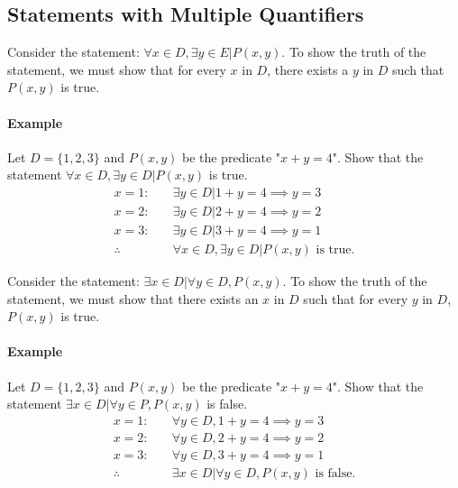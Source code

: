 \subsection{Statements with Multiple Quantifiers}
\hrulefill

Consider the statement: $\forall x \in D, \exists y \in E | P(x,y)$. To show the truth of the statement, 
we must show that for every $x$ in $D$, there exists a $y$ in $D$ such that $P(x,y)$ is true.

\paragraph*{Example}
Let $D = \{1,2,3\}$ and $P(x,y)$ be the predicate "$x + y = 4$". Show that the statement
$\forall x \in D, \exists y \in D | P(x,y)$ is true.
\begin{align*}
    x = 1: \quad &\exists y \in D | 1 + y = 4 \implies y = 3\\
    x = 2: \quad &\exists y \in D | 2 + y = 4 \implies y = 2\\
    x = 3: \quad &\exists y \in D | 3 + y = 4 \implies y = 1\\
    \therefore \quad &\forall x \in D, \exists y \in D | P(x,y) \text{ is true.}
\end{align*}

Consider the statement: $\exists x \in D | \forall y \in D, P(x,y)$. To show the truth of the statement,
we must show that there exists an $x$ in $D$ such that for every $y$ in $D$, $P(x,y)$ is true.

\paragraph*{Example}
Let $D = \{1,2,3\}$ and $P(x,y)$ be the predicate "$x + y = 4$". Show that the statement
$\exists x \in D | \forall y \in P, P(x,y)$ is false.
\begin{align*}
    x = 1: \quad &\forall y \in D, 1 + y = 4 \implies y = 3\\
    x = 2: \quad &\forall y \in D, 2 + y = 4 \implies y = 2\\
    x = 3: \quad &\forall y \in D, 3 + y = 4 \implies y = 1\\
    \therefore \quad &\exists x \in D | \forall y \in D, P(x,y) \text{ is false.}
\end{align*}